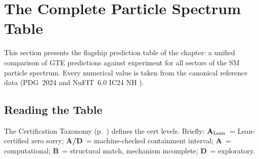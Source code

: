 \documentclass[11pt,openany]{book}
\theoremstyle{remark}
\newcommand{\CatA}{\textbf{A}}
\newcommand{\CatAL}{\ensuremath{\textbf{A}_{\rm Lean}}}
\newcommand{\CatAD}{\textbf{A/D}}
\newcommand{\CatB}{\textbf{B}}
\newcommand{\CatD}{\textbf{D}}
\begin{document}
\section{The Complete Particle Spectrum Table}
\label{sec:spectrum_table}

This section presents the flagship prediction table of the chapter: a unified comparison
of GTE predictions against experiment for all sectors of the SM particle spectrum.
Every numerical value is taken from the canonical reference data (PDG~2024
\cite{ParticleDataGroup2024} and NuFIT~6.0 IC24 NH \cite{NuFIT60}).

\subsection*{Reading the Table}

The Certification Taxonomy (p.~\pageref{chap:taxonomy}) defines the cert levels.
Briefly: \CatAL~= Lean-certified zero sorry; \CatAD~= machine-checked containment interval;
\CatA~= computational; \CatB~= structural match, mechanism incomplete; \CatD~= exploratory.
\end{document}
